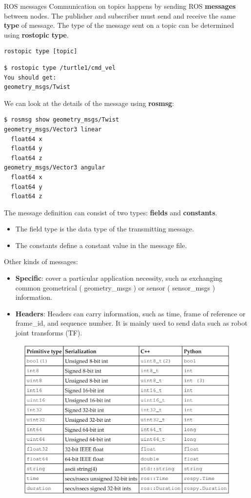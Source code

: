\begin{frame}{ROS messages}
Communication on topics happens by sending ROS \textbf{messages} between nodes. The publisher and subscriber must send and receive the same \textbf{type} of message. The type of the message sent on a topic can be determined using \textbf{rostopic type}.

\begin{lstlisting}[language=syntax]
rostopic type [topic]
\end{lstlisting}

\begin{lstlisting}[language=shell]
$ rostopic type /turtle1/cmd_vel
You should get:
geometry_msgs/Twist
\end{lstlisting}

We can look at the details of the message using \textbf{rosmsg}:

\begin{lstlisting}[language=shell]
$ rosmsg show geometry_msgs/Twist
geometry_msgs/Vector3 linear
  float64 x
  float64 y
  float64 z
geometry_msgs/Vector3 angular
  float64 x
  float64 y
  float64 z
\end{lstlisting}

\framebreak

The message definition can consist of two types: \textbf{fields} and \textbf{constants}. 
\begin{itemize}
		\item  The field type is the data type of the transmitting message. 
		\item The constants define a constant value in the message file.
\end{itemize}

\vspace{.3cm}
Other kinds of messages:
\begin{itemize}
	\item \textbf{Specific}: cover a particular application necessity, such as
	exchanging common geometrical ( geometry\_msgs ) or sensor ( sensor\_msgs ) information.
	\item \textbf{Headers}: Headers can carry information,
	such as time, frame of reference or frame\_id, and sequence number. It is mainly used to send data such as robot joint transforms (TF).
\end{itemize}

\framebreak

	\begin{figure}
		\includegraphics[width=.65\textwidth]{./img/ros/MessageType.png}
	\end{figure}


\end{frame}
